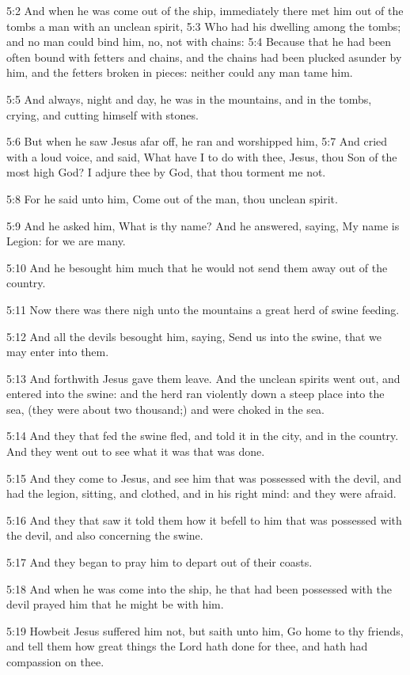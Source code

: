 5:2 And when he was come out of the ship, immediately there met him out of the tombs a man with an unclean spirit, 5:3 Who had his dwelling among the tombs; and no man could bind him, no, not with chains: 5:4 Because that he had been often bound with fetters and chains, and the chains had been plucked asunder by him, and the fetters broken in pieces: neither could any man tame him.

5:5 And always, night and day, he was in the mountains, and in the tombs, crying, and cutting himself with stones.

5:6 But when he saw Jesus afar off, he ran and worshipped him, 5:7 And cried with a loud voice, and said, What have I to do with thee, Jesus, thou Son of the most high God? I adjure thee by God, that thou torment me not.

5:8 For he said unto him, Come out of the man, thou unclean spirit.

5:9 And he asked him, What is thy name? And he answered, saying, My name is Legion: for we are many.

5:10 And he besought him much that he would not send them away out of the country.

5:11 Now there was there nigh unto the mountains a great herd of swine feeding.

5:12 And all the devils besought him, saying, Send us into the swine, that we may enter into them.

5:13 And forthwith Jesus gave them leave. And the unclean spirits went out, and entered into the swine: and the herd ran violently down a steep place into the sea, (they were about two thousand;) and were choked in the sea.

5:14 And they that fed the swine fled, and told it in the city, and in the country. And they went out to see what it was that was done.

5:15 And they come to Jesus, and see him that was possessed with the devil, and had the legion, sitting, and clothed, and in his right mind: and they were afraid.

5:16 And they that saw it told them how it befell to him that was possessed with the devil, and also concerning the swine.

5:17 And they began to pray him to depart out of their coasts.

5:18 And when he was come into the ship, he that had been possessed with the devil prayed him that he might be with him.

5:19 Howbeit Jesus suffered him not, but saith unto him, Go home to thy friends, and tell them how great things the Lord hath done for thee, and hath had compassion on thee.

